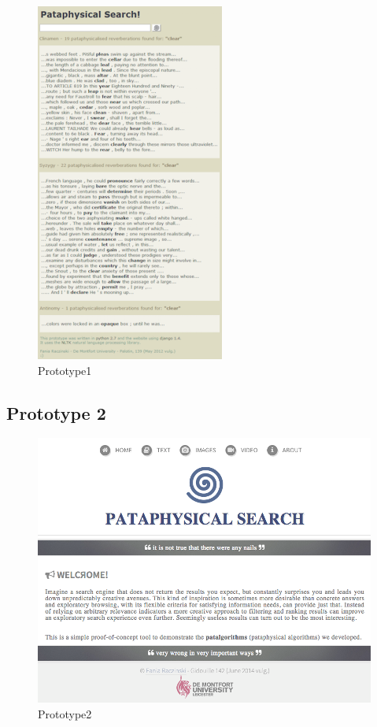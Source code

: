 \begin{figure}[htb] %
  \centering
  \includegraphics[height=0.6\textheight]{images/prototype01}
\caption[Prototype1]{Prototype1}
\label{fig:Prototype1}
\end{figure}

\subsection{Prototype 2}

\begin{figure}[htb] %
  \centering
  \includegraphics[width=\linewidth]{images/prototype02}
\caption[Prototype2]{Prototype2}
\label{fig:Prototype2}
\end{figure}

